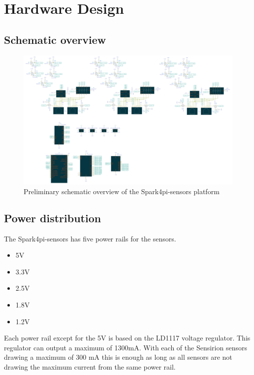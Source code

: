 \documentclass[12pt]{article}
\begin{document}
\section{Hardware Design}
\subsection{Schematic overview}
\begin{figure}[H]
    \begin{adjustwidth}{-1.5in}{-1in}
        \centering
        \includegraphics[width=\paperwidth]{spark4pi-sensors-1.png}
        \caption{Preliminary schematic overview of the Spark4pi-sensors platform}
    \end{adjustwidth}
\end{figure}

\subsection{Power distribution}
The Spark4pi-sensors has five power rails for the sensors.
\begin{itemize}
    \item 5V
    \item 3.3V
    \item 2.5V
    \item 1.8V
    \item 1.2V
\end{itemize}
Each power rail except for the 5V is based on the LD1117 voltage regulator. This regulator can output a maximum of 1300mA. With each of 
the Sensirion sensors drawing a maximum of 300 mA this is enough as long as all sensors are not drawing the maximum current from the same power rail.
\end{document}
